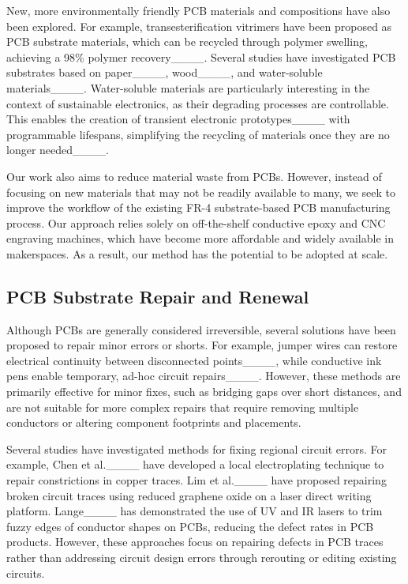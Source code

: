 New, more environmentally friendly PCB materials and compositions have also been explored. For example, transesterification vitrimers have been proposed as PCB substrate materials, which can be recycled through polymer swelling, achieving a 98\% polymer recovery____. Several studies have investigated PCB substrates based on paper____, wood____, and water-soluble materials____. 
Water-soluble materials are particularly interesting in the context of sustainable electronics, as their degrading processes are controllable. 
This enables the creation of transient electronic prototypes____ with programmable lifespans, simplifying the recycling of materials once they are no longer needed____.

Our work also aims to reduce material waste from PCBs. However, instead of focusing on new materials that may not be readily available to many, we seek to improve the workflow of the existing FR-4 substrate-based PCB manufacturing process. Our approach relies solely on off-the-shelf conductive epoxy and CNC engraving machines, which have become more affordable and widely available in makerspaces. As a result, our method has the potential to be adopted at scale.



\subsection{PCB Substrate Repair and Renewal}
Although PCBs are generally considered irreversible, several solutions have been proposed to repair minor errors or shorts. 
For example, jumper wires can restore electrical continuity between disconnected points____, while conductive ink pens enable temporary, ad-hoc circuit repairs____. 
However, these methods are primarily effective for minor fixes, such as bridging gaps over short distances, and are not suitable for more complex repairs that require removing multiple conductors or altering component footprints and placements.

Several studies have investigated methods for fixing regional circuit errors. 
For example, Chen et al.____ have developed a local electroplating technique to repair constrictions in copper traces.
Lim et al.____ have proposed repairing broken circuit traces using reduced graphene oxide on a laser direct writing platform.
Lange____ has demonstrated the use of UV and IR lasers to trim fuzzy edges of conductor shapes on PCBs, reducing the defect rates in PCB products.
However, these approaches focus on repairing defects in PCB traces rather than addressing circuit design errors through rerouting or editing existing circuits.

